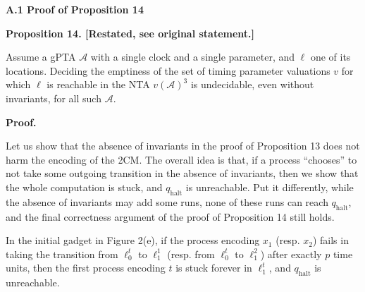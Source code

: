 \documentclass[10pt,a4paper]{article}
\begin{document}
 
\par\medskip\noindent\textbf{A.1 Proof of Proposition 14}\par
 
 
 
\par\medskip\noindent\textbf{Proposition 14. [Restated, see original statement.]}\par
 
 
Assume a gPTA $\mathcal{A}$ with a single clock and a single parameter, and $\mathrm{\ell}$ one of its locations. Deciding the emptiness of the set of timing parameter valuations $v$ for which $\mathrm{\ell}$ is reachable in the NTA ${v(\mathcal{A})}^{3}$ is undecidable, even without invariants, for all such $\mathcal{A}$.\par
 
 
 
 
 
\par\medskip\noindent\textbf{Proof.}\par
 
 
Let us show that the absence of invariants in the proof of Proposition 13 does not harm the encoding of the 2CM. The overall idea is that, if a process “chooses” to not take some outgoing transition in the absence of invariants, then we show that the whole computation is stuck, and $q_{\textrm{halt}}$ is unreachable. Put it differently, while the absence of invariants may add some runs, none of these runs can reach $q_{\textrm{halt}}$, and the final correctness argument of the proof of Proposition 14 still holds.\par
 
 
 
In the initial gadget in Figure 2(e), if the process encoding $x_{1}$ (resp. $x_{2}$) fails in taking the transition from $\mathrm{\mathrm{\ell}}_{0}^{t}$ to $\mathrm{\mathrm{\ell}}_{1}^{1}$ (resp. from $\mathrm{\mathrm{\ell}}_{0}^{t}$ to $\mathrm{\mathrm{\ell}}_{1}^{2}$) after exactly $p$ time units, then the first process encoding $t$ is stuck forever in $\mathrm{\mathrm{\ell}}_{1}^{t}$, and $q_{\textrm{halt}}$ is unreachable.\par
 
\end{document}
